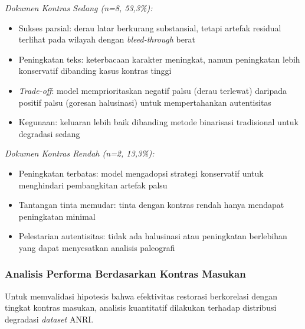 \documentclass[12pt,a4paper]{article}
\begin{document}
\textit{Dokumen Kontras Sedang (n=8, 53,3\%):}
\begin{itemize}[nosep]
    \item Sukses parsial: derau latar berkurang substansial, tetapi artefak residual terlihat pada wilayah dengan \textit{bleed-through} berat
    \item Peningkatan teks: keterbacaan karakter meningkat, namun peningkatan lebih konservatif dibanding kasus kontras tinggi
    \item \textit{Trade-off}: model memprioritaskan negatif palsu (derau terlewat) daripada positif palsu (goresan halusinasi) untuk mempertahankan autentisitas
    \item Kegunaan: keluaran lebih baik dibanding metode binarisasi tradisional untuk degradasi sedang
\end{itemize}

\textit{Dokumen Kontras Rendah (n=2, 13,3\%):}
\begin{itemize}[nosep]
    \item Peningkatan terbatas: model mengadopsi strategi konservatif untuk menghindari pembangkitan artefak palsu
    \item Tantangan tinta memudar: tinta dengan kontras rendah hanya mendapat peningkatan minimal
    \item Pelestarian autentisitas: tidak ada halusinasi atau peningkatan berlebihan yang dapat menyesatkan analisis paleografi
\end{itemize}

\vspace{0.8em}

\subsubsection{Analisis Performa Berdasarkan Kontras Masukan}
\label{subsubsec:anri-analisis-kontras}

Untuk memvalidasi hipotesis bahwa efektivitas restorasi berkorelasi dengan tingkat kontras masukan, analisis kuantitatif dilakukan terhadap distribusi degradasi \textit{dataset} ANRI.
\end{document}
